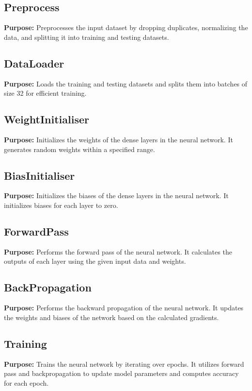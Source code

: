 \documentclass[12pt]{article}
\begin{document}
	\subsection{Preprocess}
	\textbf{Purpose:} Preprocesses the input dataset by dropping duplicates, normalizing the data, and splitting it into training and testing datasets. 
	
	\subsection{DataLoader}
	\textbf{Purpose:} Loads the training and testing datasets and splits them into batches of size 32 for efficient training.
	
	\subsection{WeightInitialiser}
	\textbf{Purpose:} Initializes the weights of the dense layers in the neural network. It generates random weights within a specified range.
	
	\subsection{BiasInitialiser}
	\textbf{Purpose:} Initializes the biases of the dense layers in the neural network. It initializes biases for each layer to zero.
	
	\subsection{ForwardPass}
	\textbf{Purpose:} Performs the forward pass of the neural network. It calculates the outputs of each layer using the given input data and weights.
	
	\subsection{BackPropagation}
	\textbf{Purpose:} Performs the backward propagation of the neural network. It updates the weights and biases of the network based on the calculated gradients.
	
	\subsection{Training}
	\textbf{Purpose:} Trains the neural network by iterating over epochs. It utilizes forward pass and backpropagation to update model parameters and computes accuracy for each epoch.
	
\end{document}
